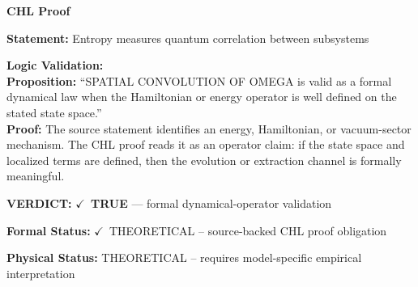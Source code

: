 \vspace{0.45em}
\noindent\textbf{CHL Proof}\par
\textbf{Statement:} Entropy measures quantum correlation between subsystems

\textbf{Logic Validation:}\\
\textbf{Proposition:} ``SPATIAL CONVOLUTION OF OMEGA is valid as a formal dynamical law when the Hamiltonian or
energy operator is well defined on the stated state space.''\\
\textbf{Proof:} The source statement identifies an energy, Hamiltonian, or vacuum-sector mechanism. The
CHL proof reads it as an operator claim: if the state space and localized terms are
defined, then the evolution or extraction channel is formally meaningful.

\textbf{VERDICT:} \ensuremath{\checkmark}\ \textbf{TRUE} --- formal dynamical-operator validation

\textbf{Formal Status:} \ensuremath{\checkmark}\ THEORETICAL -- source-backed CHL proof obligation

\textbf{Physical Status:} THEORETICAL -- requires model-specific empirical interpretation
\par\vspace{0.45em}
\par
\ifTZPDarkEdition
{}
\fi
\endgroup
\endgroup
